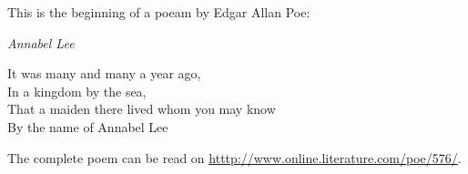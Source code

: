 \documentclass{article}
\begin{document}
\noindent This is the beginning of a poeam by Edgar Allan Poe:

\begin{center}

\emph{Annabel Lee}

\end{center}

\begin{center}

It was many and many a year ago,\\
In a kingdom by the sea,\\
That a maiden there lived whom you may know\\
By the name of Annabel Lee

\end{center}

The complete poem can be read on \url{htttp://www.online.literature.com/poe/576/}.
\end{document}
